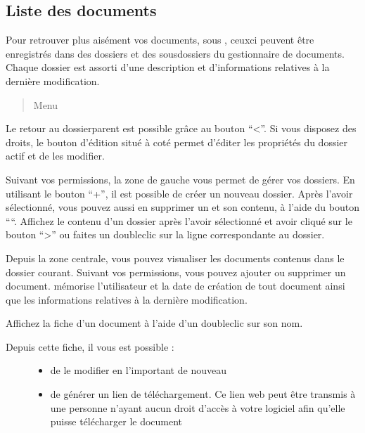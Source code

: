 \documentclass[a4paper,10pt,oneside,french]{sphinxmanual}
\begin{document}
\subsection{Liste des documents}
\label{\detokenize{documents/shared_document:liste-des-documents}}
\sphinxAtStartPar
Pour retrouver plus aisément vos documents, sous , ceux\sphinxhyphen{}ci peuvent être enregistrés dans des dossiers et des sous\sphinxhyphen{}dossiers du gestionnaire de documents.
Chaque dossier est assorti d’une description et d’informations relatives à la dernière modification.
\begin{quote}

\sphinxAtStartPar
Menu 
\end{quote}

\sphinxAtStartPar
Le retour au dossier\sphinxhyphen{}parent est possible grâce au bouton “\textless{}”.
Si vous disposez des droits, le bouton d’édition situé à coté permet d’éditer les propriétés du dossier actif et de les modifier.

\noindent{}

\sphinxAtStartPar
Suivant vos permissions, la zone de gauche vous permet de gérer vos dossiers.
En utilisant le bouton “+”, il est possible de créer un nouveau dossier.
Après l’avoir sélectionné, vous pouvez aussi en supprimer un et son contenu, à l’aide du bouton “\sphinxhyphen{}“.
Affichez le contenu d’un dossier après l’avoir sélectionné et avoir cliqué sur le bouton “\textgreater{}” ou faites un double\sphinxhyphen{}clic sur la ligne correspondante au dossier.

\sphinxAtStartPar
Depuis la zone centrale, vous pouvez visualiser les documents contenus dans le dossier courant.
Suivant vos permissions, vous pouvez ajouter ou supprimer un document.
 mémorise l’utilisateur et la date de création de tout document ainsi que les informations relatives à la dernière modification.

\sphinxAtStartPar
Affichez la fiche d’un document à l’aide d’un double\sphinxhyphen{}clic sur son nom.

\noindent{}
\begin{description}
\item[{Depuis cette fiche, il vous est possible :}] \leavevmode\begin{itemize}
\item {} 
\sphinxAtStartPar
de le modifier en l’important de nouveau

\item {} 
\sphinxAtStartPar
de générer un lien de téléchargement. Ce lien web peut être transmis à une personne n’ayant aucun droit d’accès à votre logiciel afin qu’elle puisse télécharger le document

\end{itemize}

\end{description}
\end{document}
